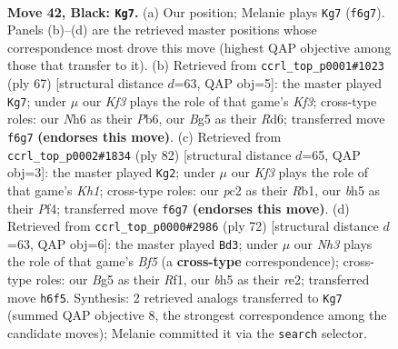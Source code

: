 \documentclass[11pt]{article}
\begin{document}
\clearpage

\begin{figure}[p]\centering
\begin{subfigure}{0.46\textwidth}\centering
\resizebox{\linewidth}{!}{%
\newchessgame
\chessboard[
  setfen={3r3r/p6p/5k1n/P5bB/8/1Pp3BP/R1P3PK/1R6 b - - 0 42},
  showmover=false,
  pgfstyle=straightmove, color=movearrow, markmove={f6-g7}
]}
\caption{}
\end{subfigure}\hfill
\begin{subfigure}{0.46\textwidth}\centering
\resizebox{\linewidth}{!}{%
\newchessgame
\chessboard[
  setfen={4B3/8/1p1r1kpp/p1b5/2P5/1P4P1/P3R1KP/8 b - - 3 34},
  showmover=false,
  pgfstyle=straightmove, color=movearrow, markmove={f6-g7}
]}
\caption{}
\end{subfigure}
\\[4pt]
\begin{subfigure}{0.46\textwidth}\centering
\resizebox{\linewidth}{!}{%
\newchessgame
\chessboard[
  setfen={8/b3rpk1/4pnpp/1B6/5P2/6P1/7P/1RR4K w - - 6 42},
  showmover=false,
  pgfstyle=straightmove, color=movearrow, markmove={h1-g2}
]}
\caption{}
\end{subfigure}\hfill
\begin{subfigure}{0.46\textwidth}\centering
\resizebox{\linewidth}{!}{%
\newchessgame
\chessboard[
  setfen={r5k1/1R3pp1/5b1p/2p2B1P/p1N5/8/4r3/5RK1 w - - 2 37},
  showmover=false,
  pgfstyle=straightmove, color=movearrow, markmove={f5-d3}
]}
\caption{}
\end{subfigure}
\caption{\textbf{Move 42, Black: \texttt{Kg7}.} (a) Our position; Melanie plays \texttt{Kg7} (\texttt{f6g7}). Panels (b)--(d) are the retrieved master positions whose correspondence most drove this move (highest QAP objective among those that transfer to it). (b) Retrieved from \texttt{ccrl\_top\_p0001\#1023} (ply 67) [structural distance $d$=63, QAP obj=5]: the master played \texttt{Kg7}; under $\mu$ our \emph{Kf3} plays the role of that game's \emph{Kf3}; cross-type roles: our \emph{N}h6 as their \emph{P}b6, our \emph{B}g5 as their \emph{R}d6; transferred move \texttt{f6g7} \textbf{(endorses this move)}. (c) Retrieved from \texttt{ccrl\_top\_p0002\#1834} (ply 82) [structural distance $d$=65, QAP obj=3]: the master played \texttt{Kg2}; under $\mu$ our \emph{Kf3} plays the role of that game's \emph{Kh1}; cross-type roles: our \emph{p}c2 as their \emph{R}b1, our \emph{b}h5 as their \emph{P}f4; transferred move \texttt{f6g7} \textbf{(endorses this move)}. (d) Retrieved from \texttt{ccrl\_top\_p0000\#2986} (ply 72) [structural distance $d$=63, QAP obj=6]: the master played \texttt{Bd3}; under $\mu$ our \emph{Nh3} plays the role of that game's \emph{Bf5} (a \textbf{cross-type} correspondence); cross-type roles: our \emph{B}g5 as their \emph{R}f1, our \emph{b}h5 as their \emph{r}e2; transferred move \texttt{h6f5}. Synthesis: 2 retrieved analogs transferred to \texttt{Kg7} (summed QAP objective 8, the strongest correspondence among the candidate moves); Melanie committed it via the \texttt{search} selector.}
\label{fig:thought-m83}
\end{figure}
\end{document}
